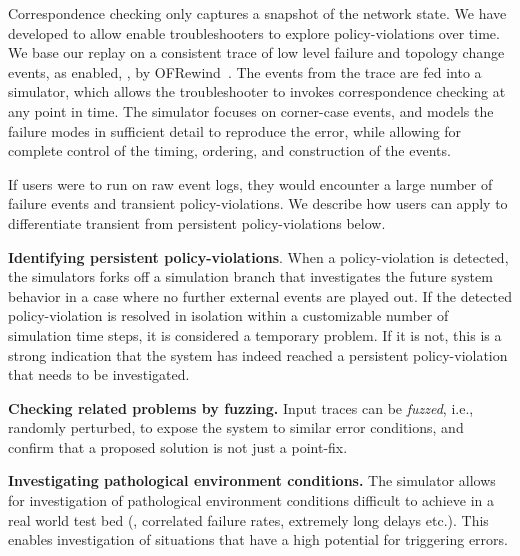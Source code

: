 
Correspondence checking only captures a snapshot of the network state.
We have developed \simulator{} to allow enable troubleshooters to explore
policy-violations over time. We base our replay on a consistent
trace of low level failure and topology change events, as enabled,
\eg{}, by OFRewind~\cite{ofrewind}. The
events from the trace are fed into a simulator, which allows the
troubleshooter to invokes correspondence
checking at any point in time. The simulator focuses on corner-case events,
and models the failure modes in sufficient detail to reproduce the error, while
allowing for complete control of the timing, ordering, and construction of the events.


If users were to run \simulator{} on raw event logs, they would encounter a
large number of failure events and transient policy-violations. We describe
how users can apply \simulator{} to differentiate transient from persistent
policy-violations below.

\textbf{Identifying persistent policy-violations}. When a policy-violation is detected,
the simulators forks off a simulation branch that investigates the future system behavior
in a case where no further external events are played out. If the detected
policy-violation
is resolved in isolation within a customizable number of simulation time steps, it is considered
a temporary problem. If it is not, this is a strong indication that the system has indeed
reached a persistent policy-violation that needs to be investigated.

\textbf{Checking related problems by fuzzing.} Input traces can be \emph{fuzzed}, i.e.,
randomly perturbed, to expose the system to similar error conditions, and confirm
that a proposed solution is not just a point-fix.

\textbf{Investigating pathological environment conditions.} The simulator allows for investigation
of pathological environment conditions difficult to achieve in a real world test bed
(\eg{}, correlated failure rates, extremely long delays etc.). This enables
investigation of situations that have a high potential for triggering errors.

